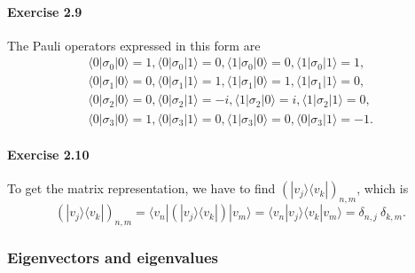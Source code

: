 \documentclass[a4paper,12pt]{article}
\newcommand{\exercise}[1]{\paragraph{Exercise #1}}
\newcommand{\la}{\langle}
\newcommand{\ra}{\rangle}
\begin{document}
    \exercise{2.9} The Pauli operators expressed in this form are
    \begin{gather}
        \nonumber
        \la 0 | \sigma_0 | 0 \ra = 1 , \la 0 | \sigma_0 | 1 \ra = 0 , \la 1 | \sigma_0 | 0 \ra = 0 , \la 1 | \sigma_0 | 1 \ra = 1 , \\
        \nonumber
        \la 0 | \sigma_1 | 0 \ra = 0 , \la 0 | \sigma_1 | 1 \ra = 1 , \la 1 | \sigma_1 | 0 \ra = 1 , \la 1 | \sigma_1 | 1 \ra = 0 , \\
        \nonumber
        \la 0 | \sigma_2 | 0 \ra = 0 , \la 0 | \sigma_2 | 1 \ra = -i , \la 1 | \sigma_2 | 0 \ra = i , \la 1 | \sigma_2 | 1 \ra = 0 , \\
        \nonumber
        \la 0 | \sigma_3 | 0 \ra = 1 , \la 0 | \sigma_3 | 1 \ra = 0 , \la 1 | \sigma_3 | 0 \ra = 0 , \la 0 | \sigma_3 | 1 \ra = -1 \textrm{.}
    \end{gather}

    \exercise{2.10} To get the matrix representation, we have to find $(| v_j \ra \la v_k |)_{n, m}$, which is
    \begin{equation}
        (| v_j \ra \la v_k |)_{n, m} = \la v_n | (| v_j \ra \la v_k |) | v_m \ra = \la v_n | v_j \ra \la v_k | v_m \ra = \delta_{n, j}\ \delta_{k, m} \textrm{.}
    \end{equation}

    \subsubsection{Eigenvectors and eigenvalues}
\end{document}
